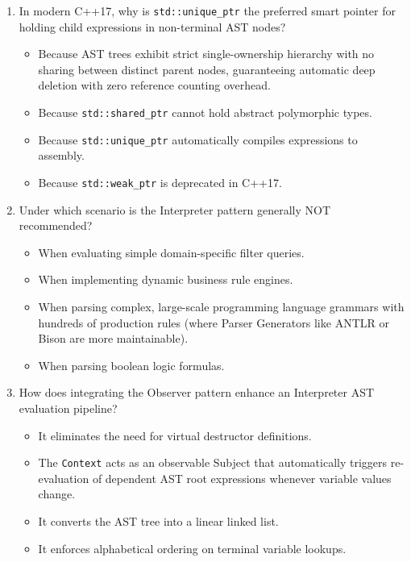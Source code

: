 \documentclass[12pt,a4paper]{article}
\begin{document}
\begin{enumerate}
    \item In modern C++17, why is \texttt{std::unique\_ptr} the preferred smart pointer for holding child expressions in non-terminal AST nodes?
    \begin{itemize}
        \item[A)] Because AST trees exhibit strict single-ownership hierarchy with no sharing between distinct parent nodes, guaranteeing automatic deep deletion with zero reference counting overhead.
        \item[B)] Because \texttt{std::shared\_ptr} cannot hold abstract polymorphic types.
        \item[C)] Because \texttt{std::unique\_ptr} automatically compiles expressions to assembly.
        \item[D)] Because \texttt{std::weak\_ptr} is deprecated in C++17.
    \end{itemize}

    \item Under which scenario is the Interpreter pattern generally NOT recommended?
    \begin{itemize}
        \item[A)] When evaluating simple domain-specific filter queries.
        \item[B)] When implementing dynamic business rule engines.
        \item[C)] When parsing complex, large-scale programming language grammars with hundreds of production rules (where Parser Generators like ANTLR or Bison are more maintainable).
        \item[D)] When parsing boolean logic formulas.
    \end{itemize}

    \item How does integrating the Observer pattern enhance an Interpreter AST evaluation pipeline?
    \begin{itemize}
        \item[A)] It eliminates the need for virtual destructor definitions.
        \item[B)] The \texttt{Context} acts as an observable Subject that automatically triggers re-evaluation of dependent AST root expressions whenever variable values change.
        \item[C)] It converts the AST tree into a linear linked list.
        \item[D)] It enforces alphabetical ordering on terminal variable lookups.
    \end{itemize}
\end{enumerate}
\end{document}
